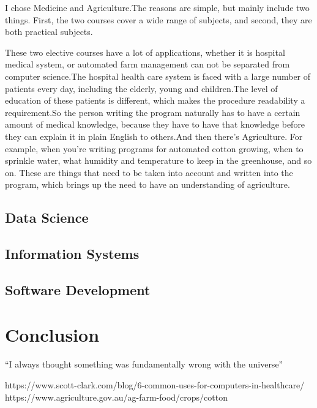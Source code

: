 \documentclass{article}
\begin{document}
  I chose Medicine and Agriculture.The reasons are simple, but mainly include two things.
First, the two courses cover a wide range of subjects, and second, they are both practical
subjects.

These two elective courses have a lot of applications, whether it is hospital medical system,
or automated farm management can not be separated from computer science.The hospital health care
system is faced with a large number of patients every day, including the elderly, young and
children.The level of education of these patients is different, which makes the procedure readability
a requirement.So the person writing the program naturally has to have a certain amount of medical
knowledge, because they have to have that knowledge before they can explain it in plain English to
others.And then there's Agriculture. For example, when you're writing programs for automated cotton
growing, when to sprinkle water, what humidity and temperature to keep in the greenhouse, and so on.
These are things that need to be taken into account and written into the program, which brings up
the need to have an understanding of agriculture.


\subsection{Data Science}


\subsection{Information Systems}


\subsection{Software Development}

\section{Conclusion}
``I always thought something was fundamentally wrong with the universe'' \citep{adams1995hitchhiker}




https://www.scott-clark.com/blog/6-common-uses-for-computers-in-healthcare/
https://www.agriculture.gov.au/ag-farm-food/crops/cotton
\end{document}
